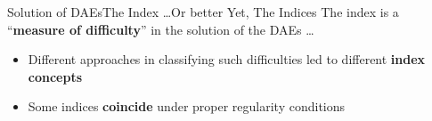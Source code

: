 \begin{frame}{Solution of \aclp{DAE}}{The Index \dots Or better Yet, The Indices}
  The index is a ``\textbf{measure of difficulty}'' in the solution of the \acsp{DAE} \dots
  \begin{itemize}
    \item Different approaches in classifying such difficulties led to different \textbf{index concepts} \\
    \item \raggedright Some indices \textbf{coincide} under proper regularity conditions
  \end{itemize}
  \vspace{0.25em}
  \vspace{0.25em}
  \scriptsize{}
\end{frame}

